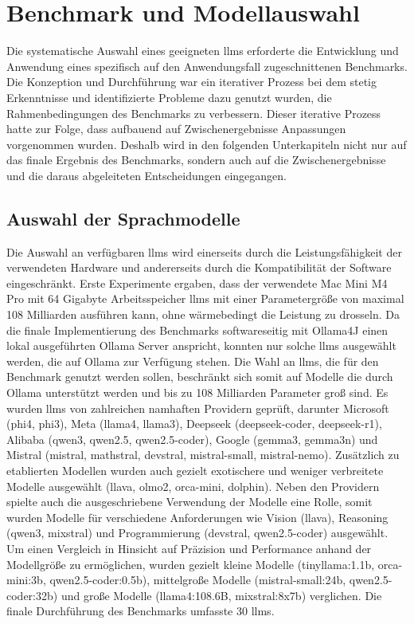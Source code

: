 \chapter{Benchmark und Modellauswahl}\label{ch:benchmark}

Die systematische Auswahl eines geeigneten \glspl{llm} erforderte die Entwicklung und Anwendung eines spezifisch auf den Anwendungsfall zugeschnittenen Benchmarks.
Die Konzeption und Durchführung war ein iterativer Prozess bei dem stetig Erkenntnisse und identifizierte Probleme dazu genutzt wurden, die Rahmenbedingungen des Benchmarks zu verbessern.
Dieser iterative Prozess hatte zur Folge, dass aufbauend auf Zwischenergebnisse Anpassungen vorgenommen wurden.
Deshalb wird in den folgenden Unterkapiteln nicht nur auf das finale Ergebnis des Benchmarks, sondern auch auf die Zwischenergebnisse und die daraus abgeleiteten Entscheidungen eingegangen.


\section{Auswahl der Sprachmodelle}\label{sec:modelle-benchmark}

Die Auswahl an verfügbaren \glspl{llm} wird einerseits durch die Leistungsfähigkeit der verwendeten Hardware und andererseits durch die Kompatibilität der Software eingeschränkt.
Erste Experimente ergaben, dass der verwendete Mac Mini M4 Pro mit 64 Gigabyte Arbeitsspeicher \glspl{llm} mit einer Parametergröße von maximal 108 Milliarden ausführen kann, ohne wärmebedingt die Leistung zu drosseln.
Da die finale Implementierung des Benchmarks softwareseitig mit Ollama4J einen lokal ausgeführten Ollama Server anspricht, konnten nur solche \glspl{llm} ausgewählt werden, die auf Ollama zur Verfügung stehen.
Die Wahl an \glspl{llm}, die für den Benchmark genutzt werden sollen, beschränkt sich somit auf Modelle die durch Ollama unterstützt werden und bis zu 108 Milliarden Parameter groß sind.
Es wurden \glspl{llm} von zahlreichen namhaften Providern geprüft, darunter Microsoft (phi4, phi3), Meta (llama4, llama3), Deepseek (deepseek-coder, deepseek-r1), Alibaba (qwen3, qwen2.5, qwen2.5-coder), Google (gemma3, gemma3n) und Mistral (mistral, mathstral, devstral, mistral-small, mistral-nemo).
Zusätzlich zu etablierten Modellen wurden auch gezielt exotischere und weniger verbreitete Modelle ausgewählt (llava, olmo2, orca-mini, dolphin).
Neben den Providern spielte auch die ausgeschriebene Verwendung der Modelle eine Rolle, somit wurden Modelle für verschiedene Anforderungen wie Vision (llava), Reasoning (qwen3, mixstral) und Programmierung (devstral, qwen2.5-coder) ausgewählt.
Um einen Vergleich in Hinsicht auf Präzision und Performance anhand der Modellgröße zu ermöglichen, wurden gezielt kleine Modelle (tinyllama:1.1b, orca-mini:3b, qwen2.5-coder:0.5b), mittelgroße Modelle (mistral-small:24b, qwen2.5-coder:32b) und große Modelle (llama4:108.6B, mixstral:8x7b) verglichen.
Die finale Durchführung des Benchmarks umfasste 30 \glspl{llm}.

